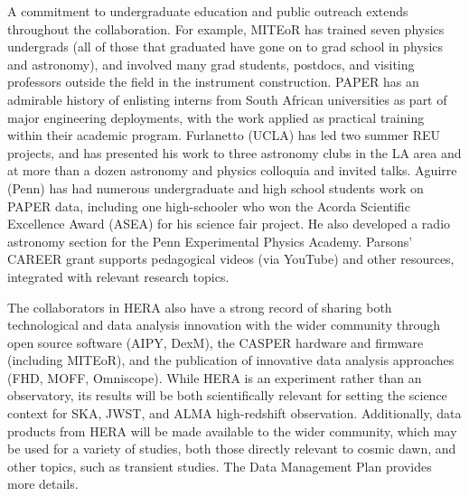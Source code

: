 \documentclass[preprint]{aastex}
\begin{document}
A commitment to undergraduate education and public outreach extends throughout the collaboration.  For example, MITEoR has trained seven physics undergrads (all of those that graduated have gone on to grad school in physics and astronomy), 
and involved many grad students, postdocs, and visiting professors outside the field in the instrument construction.  PAPER has an admirable history of enlisting interns from South African universities as 
part of major engineering deployments, with the work applied as practical training 
within their academic program.  Furlanetto (UCLA)
has led two summer REU projects, and has
presented his work to three astronomy clubs in the LA area and at more than a dozen astronomy and physics colloquia and invited talks.   Aguirre (Penn) has had numerous undergraduate and high school students work on PAPER data, including one high-schooler who won the Acorda Scientific Excellence Award (ASEA) for his science fair project. He also developed a radio astronomy section for the Penn Experimental Physics Academy.
Parsons' CAREER grant supports pedagogical videos (via YouTube) and other resources, integrated with relevant research topics.


The collaborators in HERA also have a strong record of sharing both technological and data analysis innovation with the wider community through open source software (AIPY, DexM), the CASPER hardware and firmware (including MITEoR), and the publication of innovative data analysis approaches (FHD, MOFF, Omniscope).  While HERA is an experiment rather than an observatory, its results will be both scientifically relevant for setting the science context for SKA, JWST, and ALMA high-redshift observation.  
Additionally, data products from HERA will be made available to the wider community, which may be used for a variety of studies, both those directly relevant to cosmic dawn, and other topics, such as transient studies.  The Data Management Plan provides more details. 
\end{document}
